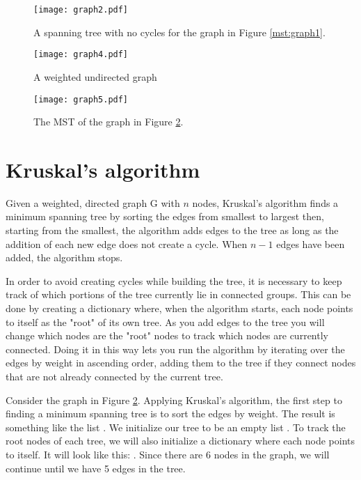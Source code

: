 \begin{figure}[H]
\texttt{[image: graph2.pdf]}
\caption{A spanning tree with no cycles for the graph in Figure \ref{mst:graph1}.}
\label{mst:graph2}
\end{figure}

\begin{figure}[H]
\texttt{[image: graph4.pdf]}
\caption{A weighted undirected graph}
\label{mst:graph4}
\end{figure}

\begin{figure}[H]
\texttt{[image: graph5.pdf]}
\caption{The MST of the graph in Figure \ref{mst:graph4}.}
\end{figure}

\section*{Kruskal's algorithm}

Given a weighted, directed graph G with $n$ nodes, Kruskal's algorithm finds a minimum spanning tree by sorting the edges from smallest to largest then, starting from the smallest, the algorithm adds edges to the tree as long as the addition of each new edge does not create a cycle.
When $n-1$ edges have been added, the algorithm stops.

In order to avoid creating cycles while building the tree, it is necessary to keep track of which portions of the tree currently lie in connected groups.
This can be done by creating a dictionary where, when the algorithm starts, each node points to itself as the "root" of its own tree.
As you add edges to the tree you will change which nodes are the "root" nodes to track which nodes are currently connected.
Doing it in this way lets you run the algorithm by iterating over the edges by weight in ascending order, adding them to the tree if they connect nodes that are not already connected by the current tree.

Consider the graph in Figure \ref{mst:graph4}.
Applying Kruskal's algorithm, the first step to finding a minimum spanning tree is to sort the edges by weight.
The result is something like the list \li{[(C, D, 1), (C, E, 1), (D, E, 2), (A, B, 3), (B, F, 4), (E, F, 4), (B, C, 5), (C, F, 5), (A, F, 6)]}.
We initialize our tree to be an empty list \li{[]}.
To track the root nodes of each tree, we will also initialize a dictionary where each node points to itself.
It will look like this: .
Since there are 6 nodes in the graph, we will continue until we have 5 edges in the tree.

